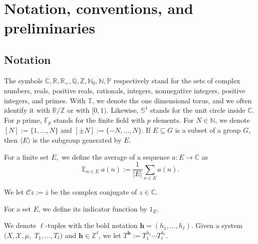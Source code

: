 \documentclass[11pt]{amsart}
\theoremstyle{definition}
\DeclareMathOperator*{\E}{\mathbb{E}}
\newcommand{\C}{{\mathbb C}}
\newcommand{\F}{{\mathbb F}}
\newcommand{\N}{{\mathbb N}}
\renewcommand{\P}{{\mathbb P}}
\newcommand{\Q}{{\mathbb Q}}
\newcommand{\R}{{\mathbb R}}
\renewcommand{\S}{\mathbb{S}}
\newcommand{\T}{{\mathbb T}}
\newcommand{\Z}{{\mathbb Z}}
\newcommand{\CC}{{\mathcal C}}
\newcommand{\CX}{{\mathcal X}}
\newcommand{\bm}{{\mathbf{m}}}
\newcommand{\bh}{{\mathbf{h}}}
\newcommand{\bx}{{\mathbf{x}}}
\newcommand{\uh}{{\underline{h}}}
\newcommand{\1}{{\mathbf{1}}}
\newcommand{\floor}[1]{{\left \lfloor #1 \right \rfloor}}
\newcommand{\rem}[1]{\left \{ #1 \right \}}
\begin{document}
\appendix
\section{Notation, conventions, and preliminaries}

\subsection{Notation}
The symbols $\C, \R, \R_+, \Q, \Z, \N_0, \N, \P$ respectively stand for the sets of complex numbers, reals, positive reals, rationals, integers, nonnegative integers, positive integers, and primes. With $\T$, we denote the one dimensional torus, and we often identify it with $\R/\Z$ or  with $[0,1)$. Likewise, $\S^1$ stands for the unit circle inside $\C$. For $p$ prime, $\F_p$ stands for the finite field with $p$ elements. For $N\in\N$, we denote $[N]:=\{1, \ldots, N\}$ and $[\pm N]:=\{-N, \ldots, N\}$. %
If $E\subseteq G$ is a subset of a group $G$, then $\langle E \rangle$ is the subgroup generated by $E$.



For a finite set $E,$ we define the average of a sequence $a:E\to \C$ as 
\[\E_{n\in E}a(n) :=\frac{1}{|E|}\sum_{n\in E}a(n).\] 

We let $\CC z := \overline{z}$ be the complex conjugate of $z\in \C$.

For a set $E$, we define its indicator function by $1_E$. %

We denote $\ell$-tuples with the bold notation $\bh = (h_1, \ldots, h_\ell)$. Given a system $(X, \CX, \mu,$  $T_1, \ldots, T_\ell)$ and $\bh\in\Z^\ell$, we let $T^\bh:=T_1^{h_1}\cdots T_\ell^{h_\ell}$.

\end{document}
